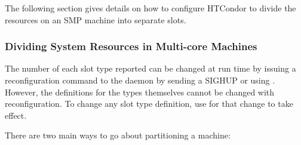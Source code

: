 The following section gives details on how to configure HTCondor to
divide the resources on an SMP machine into separate slots.

\subsubsection{\label{sec:SMP-Divide}
Dividing System Resources in Multi-core Machines}

The number of each slot type
reported can be changed at run time by issuing a reconfiguration
command to
the  daemon by sending a SIGHUP or using .
However, the definitions for the types themselves cannot be changed
with reconfiguration.
To change any slot type definition, use 
for that change to take effect.

There are two main ways to go about partitioning a machine:

